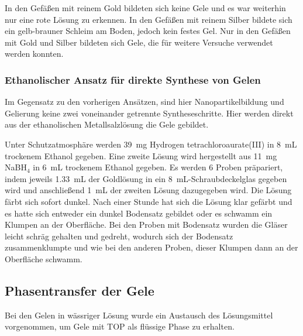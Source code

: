 			   	In den Gefäßen mit reinem Gold bildeten sich keine Gele und es war weiterhin nur eine rote Lösung zu erkennen.
			   	In den Gefäßen mit reinem Silber bildete sich ein gelb-brauner Schleim am Boden, jedoch kein festes Gel.
			   	Nur in den Gefäßen mit Gold und Silber bildeten sich Gele, die für weitere Versuche verwendet werden konnten.
			
		\subsubsection{Ethanolischer Ansatz für direkte Synthese von Gelen}
			Im Gegensatz zu den vorherigen Ansätzen, sind hier Nanopartikelbildung und Gelierung keine zwei voneinander getrennte Syntheseschritte.
			Hier werden direkt aus der ethanolischen Metallsalzlösung die Gele gebildet. \autocite{Georgi2019}
			
			Unter Schutzatmosphäre werden \SI{39}{\milli\gram} Hydrogen tetrachloroaurate(III) in \SI{8}{\milli\liter} trockenem Ethanol gegeben.
			Eine zweite Lösung wird hergestellt aus \SI{11}{\milli\gram} NaBH$_4$ in \SI{6}{\milli\liter} trockenem Ethanol gegeben.
			Es werden 6 Proben präpariert, indem jeweils \SI{1,33}{\milli\liter} der Goldlösung in ein \SI{8}{\milli\liter}-Schraubdeckelglas gegeben wird und anschließend \SI{1}{\milli\liter} der zweiten Lösung dazugegeben wird.
			Die Lösung färbt sich sofort dunkel.
			Nach einer Stunde hat sich die Lösung klar gefärbt und es hatte sich entweder ein dunkel Bodensatz gebildet oder es schwamm ein Klumpen an der Oberfläche.
			Bei den Proben mit Bodensatz wurden die Gläser leicht schräg gehalten und gedreht, wodurch sich der Bodensatz zusammenklumpte und wie bei den anderen Proben, dieser Klumpen dann an der Oberfläche schwamm.  
			
	\subsection{Phasentransfer der Gele}
	
			Bei den Gelen in wässriger Lösung wurde ein Austausch des Lösungsmittel vorgenommen, um Gele mit TOP als flüssige Phase zu erhalten.
